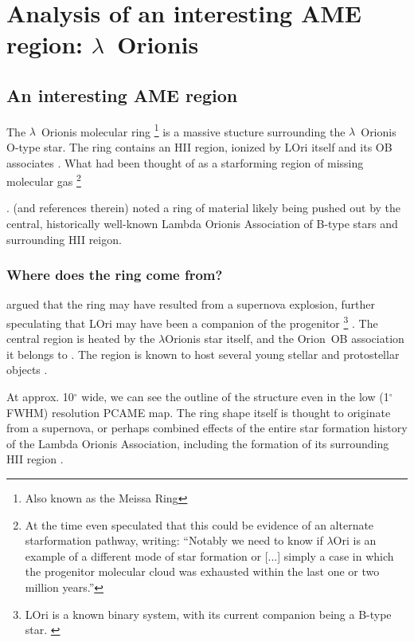 \section{Analysis of an interesting AME region: $\lambda$~Orionis}


 \subsection{An interesting AME region}
		The $\lambda$~Orionis molecular ring \footnote{Also known as the Meissa Ring} is a massive stucture surrounding the $\lambda$~Orionis O-type star. The ring contains an HII region, ionized by LOri itself and its OB associates \citep{murdin77}. What had been thought of as a star\-forming region of missing molecular gas
    \footnote{At the time \cite{murdin77} even speculated that this could be evidence of an alternate star\-formation pathway, writing: ``Notably we need to know if $\lambda$Ori is an example of a different mode of star formation or [...] simply a case in which the progenitor molecular cloud was exhausted within the last one or two million years.''}

    \cite{maddalena86,maddalena87}.  (and references therein) noted a ring of material likely being pushed out by the central, historically well-known Lambda Orionis Association of B-type stars and surrounding HII reigon.

   \subsubsection{Where does the ring come from?}
    \cite{cunha96} argued that the ring may have resulted from a supernova explosion, further speculating that LOri may have been a companion of the progenitor
    \footnote{LOri is a known binary system, with its current companion being a B-type star. \citep{murdin77}}
  .
     The central region is heated by the $\lambda$Orionis star itself, and the Orion~OB association it belongs to \citep{ochsendorf15}. The region is known to host several young stellar and protostellar objects \citep{koenig15}.

    At approx. 10$^{\circ}$ wide, we can see the outline of the structure even in the low (1$^{\circ}$ FWHM) resolution PCAME map. The ring shape itself is thought to originate from a supernova, or perhaps combined effects of the entire star formation history of the Lambda Orionis Association, including the formation of its surrounding HII region \citep{aran09}.

